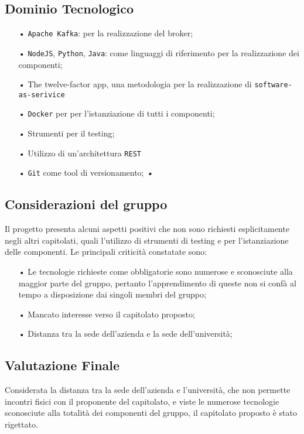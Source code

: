 \subsection{Dominio Tecnologico}
\begin{itemize}
\item[•] \texttt{Apache Kafka}: per la realizzazione del broker;
\item[•] \texttt{NodeJS}, \texttt{Python}, \texttt{Java}: come linguaggi di riferimento per la realizzazione dei componenti;
\item[•] The twelve-factor app, una metodologia per la realizzazione di \texttt{software-as-serivice}
\item[•] \texttt{Docker} per per l’istanziazione di
tutti i componenti;
\item[•] Strumenti per il testing;
\item[•] Utilizzo di un'architettura \texttt{REST}
\item[•] \texttt{Git} come tool di versionamento; 
\textsl{•}\end{itemize}
\subsection{Considerazioni del gruppo}

Il progetto presenta alcuni aspetti positivi che non sono richiesti esplicitamente negli altri capitolati, quali l'utilizzo di strumenti di testing e per l'istanziazione delle componenti. 
Le principali criticità constatate sono:
\begin{itemize}
\item[•] Le tecnologie richieste come obbligatorie sono numerose e sconosciute alla maggior parte del gruppo, pertanto l'apprendimento di queste non si confà al tempo a disposizione dai singoli membri del gruppo; 
\item[•] Mancato interesse verso il capitolato proposto;
\item[•] Distanza tra la sede dell'azienda e la sede dell'università;
\end{itemize}

\subsection{Valutazione Finale}
Considerata la distanza tra la sede dell'azienda e l'università, che non permette incontri fisici con il proponente del capitolato, e viste le numerose tecnologie sconosciute alla totalità dei componenti del gruppo, il capitolato proposto è stato rigettato.

